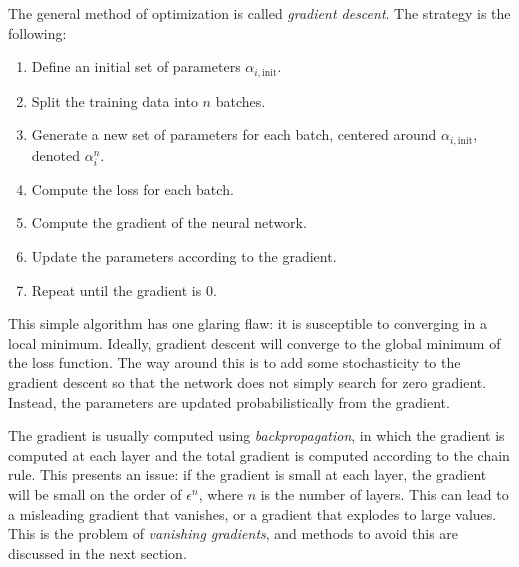 The general method of optimization is called \textit{gradient descent}. The strategy is the following:
\begin{enumerate}
	\item Define an initial set of parameters $\alpha_{i,\mathrm{init}}$.
	\item Split the training data into $n$ batches.
	\item Generate a new set of parameters for each batch, centered around $\alpha_{i,\mathrm{init}}$, denoted $\alpha^{n}_{i}$.
	\item Compute the loss for each batch.
	\item Compute the gradient of the neural network.
	\item Update the parameters according to the gradient.
	\item Repeat until the gradient is 0.
\end{enumerate}
This simple algorithm has one glaring flaw: it is susceptible to converging in a local minimum. Ideally, gradient descent will converge to the global minimum of the loss function. The way around this is to add some stochasticity to the gradient descent so that the network does not simply search for zero gradient. Instead, the parameters are updated probabilistically from the gradient.

The gradient is usually computed using \textit{backpropagation}, in which the gradient is computed at each layer and the total gradient is computed according to the chain rule. This presents an issue: if the gradient is small at each layer, the gradient will be small on the order of $\epsilon^{n}$, where $n$ is the number of layers. This can lead to a misleading gradient that vanishes, or a gradient that explodes to large values. This is the problem of \textit{vanishing gradients}, and methods to avoid this are discussed in the next section.


